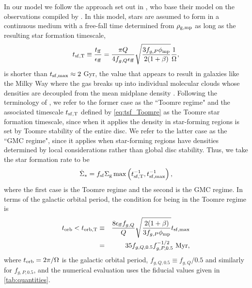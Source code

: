 \documentclass[useAMS,usenatbib]{mn2e}
\newcommand{\phimp}{\phi_{\mathrm{mp}}}
\newcommand{\rhogmp}{\rho_{\rm g,mp}}
\begin{document}
In our model we follow the approach set out in \citet{forbes14a}, who base their model on the observations compiled by \citet{krumholz12a}. In this model, stars are assumed to form in a continuous medium with a free-fall time determined from $\rhogmp$ as long as the resulting star formation timescale, 
\begin{equation}
\label{eq:tsf_Toomre}
t_{\rm sf,T} \equiv \frac{t_{\rm ff}}{\epsilon_{\rm ff}} = \frac{\pi Q}{4 f_{g,Q}\epsilon_{\rm ff}}\sqrt{\frac{3 f_{g,P} \phimp}{2(1+\beta)}} \frac{1}{\Omega},
\end{equation}
is shorter than $t_{\rm sf,max} \approx 2$ Gyr, the value that appears to result in galaxies like the Milky Way where the gas breaks up into individual molecular clouds whose densities are decoupled from the mean midplane density \citep{bigiel08a, leroy08a, leroy13a}. Following the terminology of \citet{krumholz12a}, we refer to the former case as the ``Toomre regime" and the associated timescale $t_{\rm sf,T}$ defined by \autoref{eq:tsf_Toomre} as the Toomre star formation timescale, since when it applies the density in star-forming regions is set by Toomre stability of the entire disc. We refer to the latter case as the ``GMC regime", since it applies when star-forming regions have densities determined by local considerations rather than global disc stability. Thus, we take the star formation rate to be
\begin{equation}
\label{eq:sfr1}
\dot{\Sigma}_* = f_{\rm sf} \Sigma_{\rm g} \max\left(t_{\rm sf,T}^{-1}, t_{\rm sf,max}^{-1}\right),
\end{equation}
where the first case is the Toomre regime and the second is the GMC regime. In terms of the galactic orbital period, the condition for being in the Toomre regime is 
\begin{eqnarray}
\label{eq:ttoomre}
t_{\rm orb} < t_{\rm orb,T} & \equiv & \frac{8\epsilon_{\rm ff} f_{g,Q}}{Q} \sqrt{\frac{2(1+\beta)}{3 f_{g,P} \phimp}} t_{\rm sf,max} \\
& = & 35 f_{g,Q,0.5} f_{g,P,0.5}^{-1/2}\mbox{ Myr},
\end{eqnarray}
where $t_{\rm orb} = 2\pi/\Omega$ is the galactic orbital period, $f_{g,Q,0.5} \equiv f_{g,Q}/0.5$ and similarly for $f_{g,P,0.5}$, and the numerical evaluation uses the fiducial values given in \autoref{tab:quantities}. 
\end{document}
